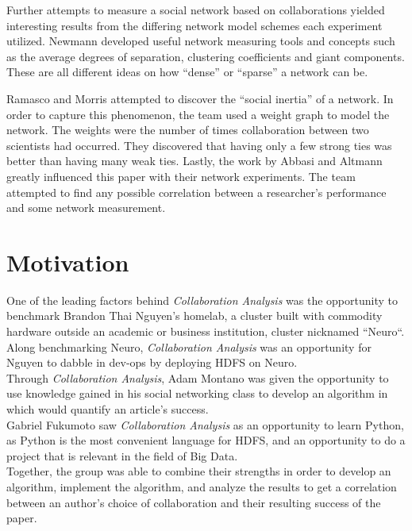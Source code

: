 \documentclass[10pt,journal,compsoc]{IEEEtran}
\begin{document}
	Further attempts to measure a social network based on collaborations yielded interesting results from the differing network model schemes each experiment utilized. Newmann developed useful network measuring tools and concepts such as the average degrees of separation, clustering coefficients and giant components. These are all different ideas on how “dense” or “sparse” a network can be. 
	
	Ramasco and Morris attempted to discover the “social inertia” of a network\cite{inertia}. In order to capture this phenomenon, the team used a weight graph to model the network. The weights were the number of times collaboration between two scientists had occurred. They discovered that having only a few strong ties was better than having many weak ties. Lastly, the work by Abbasi and Altmann greatly influenced this paper with their network experiments\cite{performance}. The team attempted to find any possible correlation between a researcher’s performance and some network measurement.
\section{Motivation}
\indent One of the leading factors behind \textit{Collaboration Analysis} was the opportunity to benchmark Brandon Thai Nguyen’s homelab, a cluster built with commodity hardware outside an academic or business institution, cluster nicknamed ``Neuro``. Along benchmarking Neuro, \textit{Collaboration Analysis} was an opportunity for Nguyen to dabble in dev-ops by deploying HDFS on Neuro. \\
\indent Through \textit{Collaboration Analysis}, Adam Montano was given the opportunity to use knowledge gained in his social networking class to develop an algorithm in which would quantify an article’s success. \\
\indent Gabriel Fukumoto saw \textit{Collaboration Analysis} as an opportunity to learn Python, as Python is the most convenient language for HDFS, and an opportunity to do a project that is relevant in the field of Big Data.\\
\indent Together, the group was able to combine their strengths in order to develop an algorithm, implement the algorithm, and analyze the results to get a correlation between an author’s choice of collaboration and their resulting success of the paper.
\end{document}

